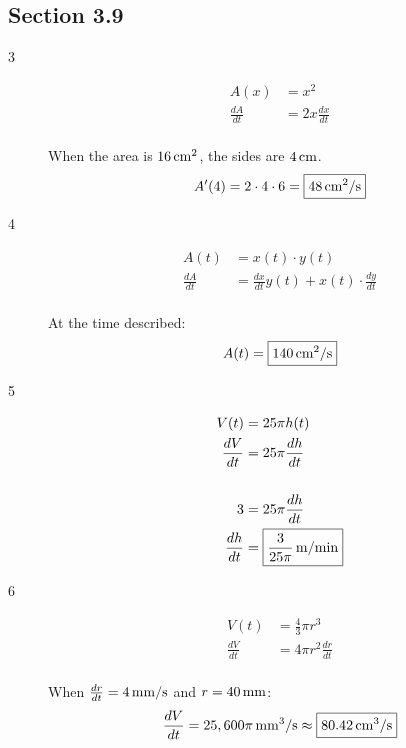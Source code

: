 \documentclass[letterpaper, landscape]{exam}
\begin{document}
  \subsection{Section 3.9}
  \begin{description}

    \item[3]
      \begin{align*}
        A(x)          & = x^2 \\
        \frac{dA}{dt} & = 2x \frac{dx}{dt} \\
      \end{align*}

      When the area is $\unit[16]{cm^2}$, the sides are $\unit[4]{cm}$.
      \[
        A'(4) = 2 \cdot 4 \cdot 6 = \boxed{ \unit[48]{cm^2/s} }
      \]

    \item[4]
      \begin{align*}
        A(t)          & = x(t) \cdot y(t) \\
        \frac{dA}{dt} & = \frac{dx}{dt} y(t) + x(t) \cdot \frac{dy}{dt} \\
      \end{align*}

      At the time described:
      \[
        A(t) = \boxed{ \unit[140]{cm^2/s} }
      \]

    \item[5]
      \begin{align*}
        V(t)          & = 25 \pi h(t) \\
        \frac{dV}{dt} & = 25 \pi \frac{dh}{dt} \\
        \\
        3             & = 25 \pi \frac{dh}{dt} \\
        \frac{dh}{dt} & = \boxed{ \unit[\frac{3}{25 \pi}]{m/min} } \\
      \end{align*}

    \item[6]
      \begin{align*}
        V(t)          & = \frac{4}{3} \pi r^3 \\
        \frac{dV}{dt} & = 4 \pi r^2 \frac{dr}{dt} \\
      \end{align*}

      When $\frac{dr}{dt} = \unit[4]{mm/s}$ and $r = \unit[40]{mm}$:
      \[
        \frac{dV}{dt} = \unit[25,600 \pi]{mm^3/s} \approx \boxed{ \unit[80.42]{cm^3/s} }
      \]


\end{description}
\end{document}
